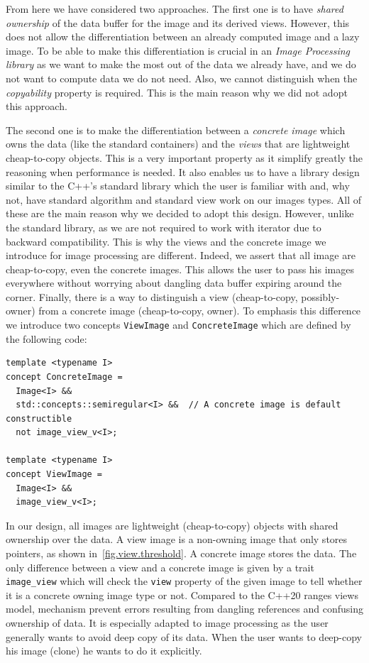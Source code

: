 From here we have considered two approaches. The first one is to have \emph{shared ownership} of the data buffer for the
image and its derived views. However, this does not allow the differentiation between an already computed image and a
lazy image. To be able to make this differentiation is crucial in an \emph{Image Processing library} as we want to make
the most out of the data we already have, and we do not want to compute data we do not need. Also, we cannot distinguish
when the \emph{copyability} property is required. This is the main reason why we did not adopt this approach.

The second one is to make the differentiation between a \emph{concrete image} which owns the data (like the standard
containers) and the \emph{views} that are lightweight cheap-to-copy objects. This is a very important property as it
simplify greatly the reasoning when performance is needed. It also enables us to have a library design similar to the
C++'s standard library which the user is familiar with and, why not, have standard algorithm and standard view work on
our images types. All of these are the main reason why we decided to adopt this design. However, unlike the standard
library, as we are not required to work with iterator due to backward compatibility. This is why the views and the
concrete image we introduce for image processing are different. Indeed, we assert that all image are cheap-to-copy, even
the concrete images. This allows the user to pass his images everywhere without worrying about dangling data buffer
expiring around the corner. Finally, there is a way to distinguish a view (cheap-to-copy, possibly-owner) from a
concrete image (cheap-to-copy, owner). To emphasis this difference we introduce two concepts \texttt{ViewImage} and
\texttt{ConcreteImage} which are defined by the following code:
\begin{verbatim}
template <typename I>
concept ConcreteImage =
  Image<I> &&
  std::concepts::semiregular<I> &&  // A concrete image is default constructible
  not image_view_v<I>;

template <typename I>
concept ViewImage =
  Image<I> &&
  image_view_v<I>;
\end{verbatim}

In our design, all images are lightweight (cheap-to-copy) objects with shared ownership over the data. A view image is a non-owning image that only stores pointers, as shown in~\cref{fig.view.threshold}. A concrete image stores the data. The only difference between a view and a concrete image is given by a trait \texttt{image\_view} which will check the
\texttt{view} property of the given image to tell whether it is a concrete owning image type or not. Compared to the
C++20 ranges views model, mechanism prevent errors resulting from dangling references and confusing ownership of data.
It is especially adapted to image processing as the user generally wants to avoid deep copy of its data. When the user
wants to deep-copy his image (clone) he wants to do it explicitly.

